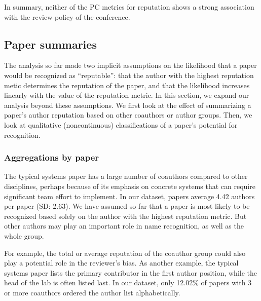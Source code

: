 \documentclass[12pt]{article}
\begin{document}
In summary, neither of the PC metrics for reputation shows a strong association with the review policy of the conference.

\hypertarget{subsec:aggregation}{%
\subsection{Paper summaries}\label{subsec:aggregation}}

The analysis so far made two implicit assumptions on the likelihood that a paper would be recognized as ``reputable'': that the author with the highest reputation metic determines the reputation of the paper, and that the likelihood increases linearly with the value of the reputation metric.
In this section, we expand our analysis beyond these assumptions.
We first look at the effect of summarizing a paper's author reputation based on other coauthors or author groups.
Then, we look at qualitative (noncontinuous) classifications of a paper's potential for recognition.

\hypertarget{aggregations-by-paper}{%
\subsubsection{Aggregations by paper}\label{aggregations-by-paper}}

The typical systems paper has a large number of coauthors compared to other disciplines, perhaps because of its emphasis on concrete systems that can require significant team effort to implement.
In our dataset, papers average
4.42 authors per paper
(SD: 2.63).
We have assumed so far that a paper is most likely to be recognized based solely on the author with the highest reputation metric.
But other authors may play an important role in name recognition, as well as the whole group.

For example, the total or average reputation of the coauthor group could also play a potential role in the reviewer's bias.
As another example, the typical systems paper lists the primary contributor in the first author position, while the head of the lab is often listed last.
In our dataset, only
12.02\%
of papers with 3 or more coauthors ordered the author list alphabetically.
\end{document}
